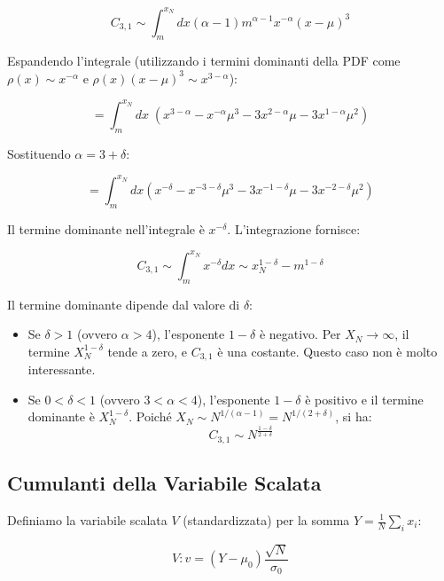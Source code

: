 \begin{equation}
C_{3,1}\sim\int_{m}^{x_{N}}dx(\alpha-1)m^{\alpha-1}x^{-\alpha}(x-\mu)^{3}
\end{equation}

Espandendo l'integrale (utilizzando i termini dominanti della PDF come $\rho(x) \sim x^{-\alpha}$ e $\rho(x) (x-\mu)^3 \sim x^{3-\alpha}$):

\begin{equation}
=\int_{m}^{x_{N}}dx \; (x^{3-\alpha}-x^{-\alpha}\mu^{3}-3x^{2-\alpha}\mu-3x^{1-\alpha}\mu^{2}) 
\end{equation}

Sostituendo $\alpha = 3 + \delta$:

\begin{equation}
=\int_{m}^{x_{N}}dx(x^{-\delta}-x^{-3-\delta}\mu^{3}-3x^{-1-\delta}\mu-3x^{-2-\delta}\mu^{2}) 
\end{equation}

Il termine dominante nell'integrale è $x^{-\delta}$. L'integrazione fornisce:

\begin{equation}
C_{3,1}\sim\int_{m}^{x_{N}}x^{-\delta}dx\sim x_{N}^{1-\delta}-m^{1-\delta}
\end{equation}

Il termine dominante dipende dal valore di $\delta$:
\begin{itemize}
    \item Se $\delta > 1$ (ovvero $\alpha > 4$), l'esponente $1-\delta$ è negativo. Per $X_N \to \infty$, il termine $X_N^{1-\delta}$ tende a zero, e $C_{3,1}$ è una costante. Questo caso non è molto interessante.
    \item Se $0 < \delta < 1$ (ovvero $3 < \alpha < 4$), l'esponente $1-\delta$ è positivo e il termine dominante è $X_N^{1-\delta}$. Poiché $X_N \sim N^{1/(\alpha-1)} = N^{1/(2+\delta)}$, si ha:
    \begin{equation}
    C_{3,1}\sim N^{\frac{1-\delta}{2+\delta}}
    \end{equation}
\end{itemize}

\subsection{Cumulanti della Variabile Scalata }

Definiamo la variabile scalata $V$ (standardizzata) per la somma $Y = \frac{1}{N}\sum_i x_i$:

\begin{equation}
V:v=(Y-\mu_{0})\frac{\sqrt{N}}{\sigma_{0}}
\end{equation}

